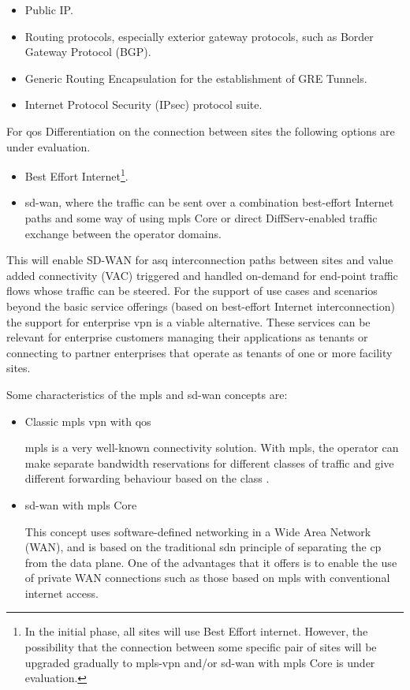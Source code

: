     \begin{itemize}
        \item Public IP.
        \item Routing protocols, especially exterior gateway protocols, such as Border Gateway Protocol (BGP).
        \item Generic Routing Encapsulation for the establishment of GRE Tunnels.
        \item Internet Protocol Security (IPsec) protocol suite.
    \end{itemize}
    For \acrshort{qos} Differentiation on the connection between sites the following options are under evaluation. 
    \begin{itemize}        
        \item Best Effort Internet\footnote{In the initial phase, all sites will use Best Effort internet. However, the possibility that the connection between some specific pair of sites will be upgraded gradually to \acrshort{mpls}-\acrshort{vpn} and/or \acrshort{sd-wan} with \acrshort{mpls} Core is under evaluation.}.
        \item \acrshort{sd-wan}, where the traffic can be sent over a combination best-effort Internet paths and some way of using \acrshort{mpls} Core or direct DiffServ-enabled traffic exchange between the operator domains.
    \end{itemize}
    
    This will enable SD-WAN for \acrfull{asq} interconnection paths between sites and value added connectivity (VAC) triggered and handled on-demand for end-point traffic flows whose traffic can be steered. For the support of use cases and scenarios beyond the basic service offerings (based on best-effort Internet interconnection) the support for enterprise \acrshort{vpn} is a viable alternative. These services can be relevant for enterprise customers managing their applications as tenants or connecting to partner enterprises that operate as tenants of one or more facility sites. 
    
    Some characteristics of the \acrshort{mpls} and \acrshort{sd-wan} concepts are:
    \begin{itemize}
        \item Classic \acrshort{mpls} \acrshort{vpn} with \acrshort{qos}
        
        \acrshort{mpls} is a very well-known connectivity solution. With \acrshort{mpls}, the operator can make separate bandwidth reservations for different classes of traffic and give different forwarding behaviour based on the class \cite{4287988}.
    
        \item \acrshort{sd-wan} with \acrshort{mpls} Core
        
        This concept uses software-defined networking in a Wide Area Network (WAN), and is based on the traditional \acrfull{sdn} principle of separating the \acrshort{cp} from the data plane. One of the advantages that it offers is to enable the use of private WAN connections such as those based on \acrshort{mpls} with conventional internet access. \cite{7939138, 8308427}
    \end{itemize}

